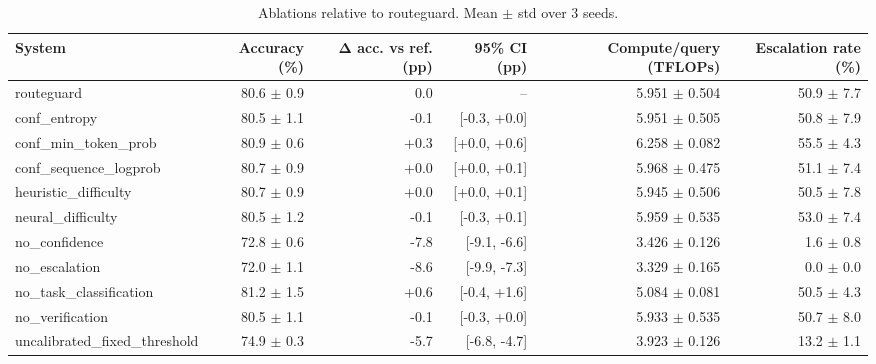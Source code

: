 \begin{table}[t]
\centering
\small
\caption{Ablations relative to routeguard. Mean $\pm$ std over 3 seeds.}
\label{tab:ablations}
\begin{tabular}{lrrrrr}
\toprule
System & Accuracy (\%) & Δ acc. vs ref. (pp) & 95\% CI (pp) & Compute/query (TFLOPs) & Escalation rate (\%) \\
\midrule
routeguard & 80.6 $\pm$ 0.9 & 0.0 & -- & 5.951 $\pm$ 0.504 & 50.9 $\pm$ 7.7 \\
conf\_entropy & 80.5 $\pm$ 1.1 & -0.1 & [-0.3, +0.0] & 5.951 $\pm$ 0.505 & 50.8 $\pm$ 7.9 \\
conf\_min\_token\_prob & 80.9 $\pm$ 0.6 & +0.3 & [+0.0, +0.6] & 6.258 $\pm$ 0.082 & 55.5 $\pm$ 4.3 \\
conf\_sequence\_logprob & 80.7 $\pm$ 0.9 & +0.0 & [+0.0, +0.1] & 5.968 $\pm$ 0.475 & 51.1 $\pm$ 7.4 \\
heuristic\_difficulty & 80.7 $\pm$ 0.9 & +0.0 & [+0.0, +0.1] & 5.945 $\pm$ 0.506 & 50.5 $\pm$ 7.8 \\
neural\_difficulty & 80.5 $\pm$ 1.2 & -0.1 & [-0.3, +0.1] & 5.959 $\pm$ 0.535 & 53.0 $\pm$ 7.4 \\
no\_confidence & 72.8 $\pm$ 0.6 & -7.8 & [-9.1, -6.6] & 3.426 $\pm$ 0.126 & 1.6 $\pm$ 0.8 \\
no\_escalation & 72.0 $\pm$ 1.1 & -8.6 & [-9.9, -7.3] & 3.329 $\pm$ 0.165 & 0.0 $\pm$ 0.0 \\
no\_task\_classification & 81.2 $\pm$ 1.5 & +0.6 & [-0.4, +1.6] & 5.084 $\pm$ 0.081 & 50.5 $\pm$ 4.3 \\
no\_verification & 80.5 $\pm$ 1.1 & -0.1 & [-0.3, +0.0] & 5.933 $\pm$ 0.535 & 50.7 $\pm$ 8.0 \\
uncalibrated\_fixed\_threshold & 74.9 $\pm$ 0.3 & -5.7 & [-6.8, -4.7] & 3.923 $\pm$ 0.126 & 13.2 $\pm$ 1.1 \\
\bottomrule
\end{tabular}
\end{table}
